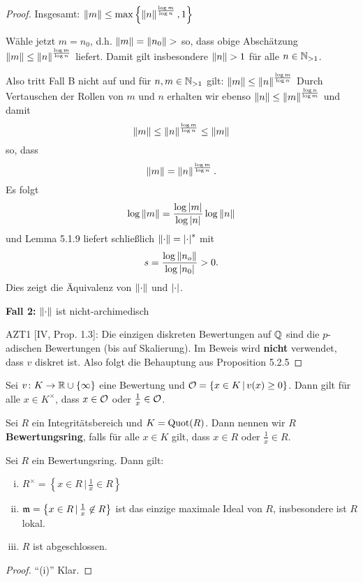 \begin{proof}
\bigskip Insgesamt: $\left\|{m}\right\| \leq \max \left\{  \left\|{n}\right\|^{ \frac{\log m}{\log n} }, 1  \right\}$

Wähle jetzt $m =n_0$, d.h. $\norm{m} = \norm{n_0}>$ so, dass obige Abschätzung
$\left\|{m}\right\| \leq \left\|{n}\right\|^{ \frac{\log m}{\log n} }$ liefert. Damit gilt insbesondere $\norm{n}>1$ für alle $n \in \mathbb{N}_{>1}$.

Also tritt Fall B nicht auf und für $n,m \in \mathbb{N}_{>1}$ gilt: $\left\|{m}\right\| \leq \left\|{n}\right\|^{ \frac{\log m}{\log n} }$ 
Durch Vertauschen der Rollen von $m$ und $n$ erhalten wir ebenso 
$\left\|{n}\right\| \leq \left\|{m}\right\|^{ \frac{\log n}{\log m} }$ und damit
\[ \left\|{m}\right\| \leq \left\|{n}\right\|^{ \frac{\log m}{\log n} } \leq \left\|{m}\right\|
\]
so, dass
\[ \left\|{m}\right\| =\left\|{n}\right\|^{ \frac{\log m}{\log n} }.
\]
Es folgt
\[ \log\left\|{m}\right\| =\frac{\log\left|{m}\right|}{\log\left|{n}\right|} \log\left\|{n}\right\|
\]
und Lemma 5.1.9 liefert schließlich $\left\|{\cdot}\right\| = \left|{\cdot}\right|^s$ mit
\[ s = \frac{\log\left\|{n_o}\right\|}{\log\left|{n_0}\right|} > 0.
\]
Dies zeigt die Äquivalenz von $\left\|{\cdot}\right\|$ und $\left|{\cdot}\right|$.

\bigskip \textbf{Fall 2:} $\left\|{\cdot}\right\|$ ist nicht-archimedisch

AZT1 [IV, Prop. 1.3]: Die einzigen diskreten Bewertungen auf $\mathbb{Q}$ sind die $p$-adischen Bewertungen (bis auf Skalierung). Im Beweis wird \textbf{nicht} verwendet, dass $v$ diskret ist.
Also folgt die Behauptung aus Proposition 5.2.5
\end{proof}


\begin{Bem}
Sei $v\colon K \to \mathbb{R} \cup \{\infty \} $ eine Bewertung und
$\mathcal{O} = \{ x \in K \, | \, v(x) \geq 0 \}$. Dann gilt für alle $x \in K^\times$, dass $x \in \mathcal{O}$ oder $\frac{1}{x} \in \mathcal{O}$.
\end{Bem}


\begin{defi}
Sei $R$ ein Integritätsbereich und $K = \operatorname{Quot}(R)$. Dann nennen wir $R$ \textbf{Bewertungsring}, falls
für alle $x \in K$ gilt, dass $x \in R$ oder $\frac{1}{x} \in R$.
\end{defi}

\begin{Prop}
Sei $R$ ein Bewertungsring. Dann gilt:
\begin{enumerate}[(i)]
\item $R^\times = \left\{ x \in R \, | \, \frac{1}{x} \in R \right\}$
\item $\mathfrak{m} = \left\{ x \in R \, | \, \frac{1}{x} \not\in R \right\}$ ist das einzige maximale Ideal von $R$, insbesondere ist $R$ lokal.
\item $R$ ist abgeschlossen.
\end{enumerate}
\end{Prop}


\begin{proof}
\enquote{(i)} Klar.
\end{proof}

